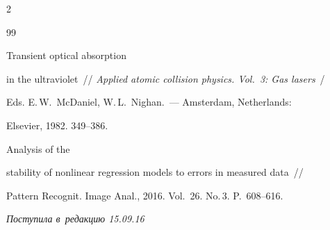 \begin{multicols}{2}
{{\begin{thebibliography}{99}

  Transient optical absorption 

in the ultraviolet~// \textit{Applied atomic collision physics. Vol.~3: Gas lasers}~/

Eds. E.\,W.~McDaniel, W.\,L.~Nighan.~--- Amsterdam, Netherlands:

Elsevier, 1982.  349--386.




  Analysis of the

  stability of nonlinear regression models to errors in measured data~//

{Pattern Recognit. Image Anal.}, 2016. Vol.~26. No.\,3. P.~608--616.

 \end{thebibliography}



 }

 }



\end{multicols}



\vspace*{-3pt}



\hfill{\small\textit{Поступила в~редакцию 15.09.16}}






\newpage



\vspace*{-28pt}












\vspace*{-2pt}





\def\tit{ON MODIFICATION OF THE MEAN SQUARED ERROR LOSS FUNCTION FOR~SOLVING NONLINEAR 

HETEROSCEDASTIC ERRORS-IN-VARIABLES PROBLEMS}



